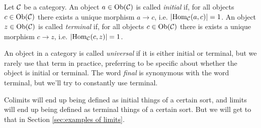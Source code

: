 
\subsubsection{}

\begin{definition}

Let $\mathcal{C}$ be a category. An object $a\in\textnormal{Ob}(\mathcal{C})$ is called {\em initial} if, for all objects $c\in\textnormal{Ob}(\mathcal{C})$ there exists a unique morphism $a\to c$, i.e. $|\textnormal{Hom}_\mathcal{C}(a,c)|=1$. An object $z\in\textnormal{Ob}(\mathcal{C})$ is called {\em terminal} if, for all objects $c\in\textnormal{Ob}(\mathcal{C})$ there is exists a unique morphism $c\to z$, i.e. $|\textnormal{Hom}_\mathcal{C}(c,z)|=1$. 

\end{definition}

An object in a category is called {\em universal} if it is either initial or terminal, but we rarely use that term in practice, preferring to be specific about whether the object is initial or terminal. The word {\em final} is synonymous with the word terminal, but we'll try to constantly use terminal. 

Colimits will end up being defined as initial things of a certain sort, and limits will end up being defined as terminal things of a certain sort. But we will get to that in Section \ref{sec:examples of limits}.

